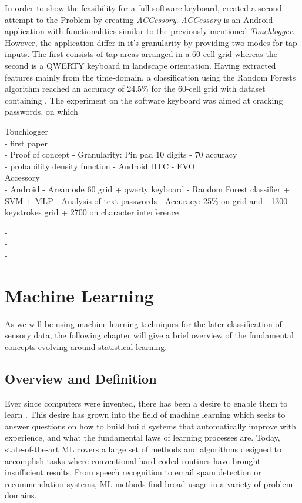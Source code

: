 In order to show the feasibility for a full software keyboard, \citeauthor{Accessory} created a second attempt to the Problem by creating \textit{ACCessory}. \textit{ACCessory} is an Android application with functionalities similar to the previously mentioned \textit{Touchlogger}. However, the application differ in it's granularity by providing two modes for tap inputs. The first consists of tap areas arranged in a 60-cell grid whereas the second is a QWERTY keyboard in landscape orientation. Having extracted features mainly from the time-domain, a classification using the Random Forests algorithm reached an accuracy of 24.5\% for the 60-cell grid with dataset containing . The experiment on the software keyboard was aimed at cracking passwords, on which 

Touchlogger\\
- first paper\\
- Proof of concept
- Granularity: Pin pad 10 digits - 70 accuracy\\
- probability density function
- Android HTC - EVO\\

Accessory\\
- Android 
- Areamode 60 grid + qwerty keyboard
- Random Forest classifier + SVM + MLP 
- Analysis of text passwords
- Accuracy: 25\% on grid and 
- 1300 keystrokes grid + 2700 on character interference




- \cite{Touchlogger} \\
- \cite{Tapprints} \\
- \cite{Accessory} \\

\newpage
\section{Machine Learning \label{sec:fieldstudy}}
As we will be using machine learning techniques for the later classification of sensory data, the following chapter will give a brief overview of the fundamental concepts evolving around statistical learning.

\subsection{Overview and Definition}

Ever since computers were invented, there has been a desire to enable them to learn \cite{samuel2000some}. This desire has grown into the field of machine learning which seeks to answer questions on how to build build systems that automatically improve with experience, and what the fundamental laws of learning processes are. Today, state-of-the-art ML covers a large set of methods and algorithms designed to accomplish tasks where conventional hard-coded routines have brought insufficient results. From speech recognition to email spam detection or recommendation systems, ML methods find broad usage in a variety of problem domains. \\

